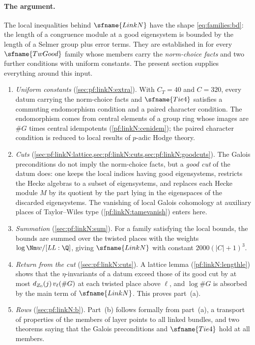 \paragraph{The argument.}
The local inequalities behind $\sfname{LinkN}$ have the shape \eqref{eq:families:bd}: the length of a congruence module at
a good eigensystem is bounded by the length of a Selmer group plus error terms. They are established in
 for every $\sfname{TwGood}$ family whose members carry the
\emph{norm-choice facts} and two further conditions with uniform constants. The present section supplies everything
around this input.
\begin{enumerate}[label=(\arabic*)]
\item \emph{Uniform constants} (\cref{sec:pf:linkN:extra}). With $C_T=40$ and $C=320$, every datum carrying the
norm-choice facts and $\sfname{Tie4}$ satisfies a commuting endomorphism condition and a paired character condition. The
endomorphism comes from central elements of a group ring whose images are $\#G$ times central idempotents
(\cref{pf:linkN:cenidem}); the paired character condition is reduced to local results of $p$-adic Hodge theory.
\item \emph{Cuts} (\cref{sec:pf:linkN:lattice,sec:pf:linkN:cuts,sec:pf:linkN:goodcuts}). The Galois preconditions do not
imply the norm-choice facts, but a \emph{good cut} of the datum does: one keeps the local indices having good
eigensystems, restricts the Hecke algebras to a subset of eigensystems, and replaces each Hecke module $M$ by its quotient
by the part lying in the eigenspaces of the discarded eigensystems. The vanishing of local Galois cohomology at
auxiliary places of Taylor--Wiles type (\cref{pf:linkN:tamevanish}) enters here.
\item \emph{Summation} (\cref{sec:pf:linkN:sum}). For a family satisfying the local bounds, the bounds are summed over the
twisted places with the weights $\log\Nm w/[\mathit{LL}:\Q]$, giving $\sfname{LinkN}$ with constant $2000(|C|+1)^3$.
\item \emph{Return from the cut} (\cref{sec:pf:linkN:cuts}). A lattice lemma (\cref{pf:linkN:lengthle}) shows that the
$\eta$-invariants of a datum exceed those of its good cut by at most $d_{Z_0}(j)\,v_\ell(\#G)$ at each twisted place
above $\ell$, and $\log\#G$ is absorbed by the main term of $\sfname{LinkN}$. This proves part~(a).
\item \emph{Rows} (\cref{sec:pf:linkN:b}). Part~(b) follows formally from part~(a), a transport of properties of the
members of layer points to all linked bundles, and two theorems saying that the Galois preconditions and $\sfname{Tie4}$
hold at all members.
\end{enumerate}

